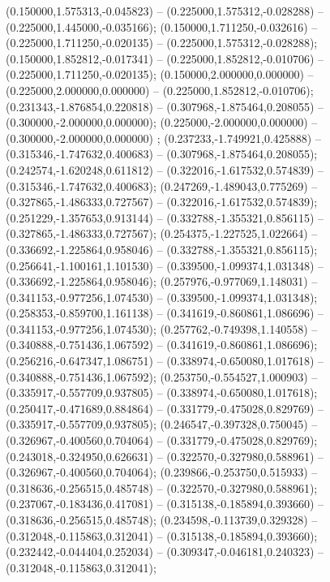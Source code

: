  (0.150000,1.575313,-0.045823) -- (0.225000,1.575312,-0.028288) -- (0.225000,1.445000,-0.035166);
 (0.150000,1.711250,-0.032616) -- (0.225000,1.711250,-0.020135) -- (0.225000,1.575312,-0.028288);
 (0.150000,1.852812,-0.017341) -- (0.225000,1.852812,-0.010706) -- (0.225000,1.711250,-0.020135);
 (0.150000,2.000000,0.000000) -- (0.225000,2.000000,0.000000) -- (0.225000,1.852812,-0.010706);
 (0.231343,-1.876854,0.220818) -- (0.307968,-1.875464,0.208055) -- (0.300000,-2.000000,0.000000);
 (0.225000,-2.000000,0.000000) -- (0.300000,-2.000000,0.000000) ;
 (0.237233,-1.749921,0.425888) -- (0.315346,-1.747632,0.400683) -- (0.307968,-1.875464,0.208055);
 (0.242574,-1.620248,0.611812) -- (0.322016,-1.617532,0.574839) -- (0.315346,-1.747632,0.400683);
 (0.247269,-1.489043,0.775269) -- (0.327865,-1.486333,0.727567) -- (0.322016,-1.617532,0.574839);
 (0.251229,-1.357653,0.913144) -- (0.332788,-1.355321,0.856115) -- (0.327865,-1.486333,0.727567);
 (0.254375,-1.227525,1.022664) -- (0.336692,-1.225864,0.958046) -- (0.332788,-1.355321,0.856115);
 (0.256641,-1.100161,1.101530) -- (0.339500,-1.099374,1.031348) -- (0.336692,-1.225864,0.958046);
 (0.257976,-0.977069,1.148031) -- (0.341153,-0.977256,1.074530) -- (0.339500,-1.099374,1.031348);
 (0.258353,-0.859700,1.161138) -- (0.341619,-0.860861,1.086696) -- (0.341153,-0.977256,1.074530);
 (0.257762,-0.749398,1.140558) -- (0.340888,-0.751436,1.067592) -- (0.341619,-0.860861,1.086696);
 (0.256216,-0.647347,1.086751) -- (0.338974,-0.650080,1.017618) -- (0.340888,-0.751436,1.067592);
 (0.253750,-0.554527,1.000903) -- (0.335917,-0.557709,0.937805) -- (0.338974,-0.650080,1.017618);
 (0.250417,-0.471689,0.884864) -- (0.331779,-0.475028,0.829769) -- (0.335917,-0.557709,0.937805);
 (0.246547,-0.397328,0.750045) -- (0.326967,-0.400560,0.704064) -- (0.331779,-0.475028,0.829769);
 (0.243018,-0.324950,0.626631) -- (0.322570,-0.327980,0.588961) -- (0.326967,-0.400560,0.704064);
 (0.239866,-0.253750,0.515933) -- (0.318636,-0.256515,0.485748) -- (0.322570,-0.327980,0.588961);
 (0.237067,-0.183436,0.417081) -- (0.315138,-0.185894,0.393660) -- (0.318636,-0.256515,0.485748);
 (0.234598,-0.113739,0.329328) -- (0.312048,-0.115863,0.312041) -- (0.315138,-0.185894,0.393660);
 (0.232442,-0.044404,0.252034) -- (0.309347,-0.046181,0.240323) -- (0.312048,-0.115863,0.312041);
